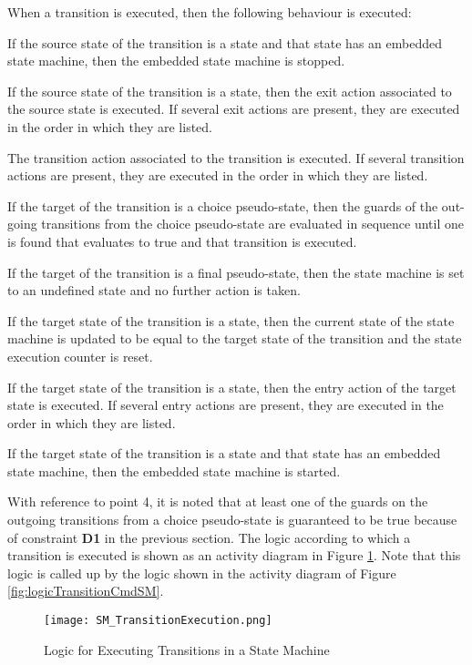 When a transition is executed, then the following behaviour is executed:

\begin{fw_enumerate}
\item If the source state of the transition is a state and that state has an embedded state
machine, then the embedded state machine is stopped.
\item If the source state of the transition is a state, then the exit action associated to the
source state is executed. If several exit actions are present, they are executed in the
order in which they are listed.
\item The transition action associated to the transition is executed. If several transition
actions are present, they are executed in the order in which they are listed.
\item If the target of the transition is a choice pseudo-state, then the guards of the out-going
transitions from the choice pseudo-state are evaluated in sequence until one is found
that evaluates to true and that transition is executed.
\item If the target of the transition is a final pseudo-state, then the state machine is set to an
undefined state and no further action is taken.
\item If the target state of the transition is a state, then the current state of the state machine
is updated to be equal to the target state of the transition and the state execution counter is
reset.
\item If the target state of the transition is a state, then the entry action of the target state is
executed. If several entry actions are present, they are executed in the order in which
they are listed.
\item If the target state of the transition is a state and that state has an embedded state
machine, then the embedded state machine is started.
\end{fw_enumerate}

With reference to point 4, it is noted that at least one of the guards on the outgoing transitions from a choice pseudo-state is guaranteed to be true 
because of constraint \textbf{D1} in the previous section.
The logic according to which a transition is executed is shown as an activity diagram in Figure \ref{fig:execTransitionSM}. Note that this logic is called up 
by the logic shown in the activity diagram of Figure \ref{fig:logicTransitionCmdSM}.

\begin{figure}[ht]
 \centering
 \texttt{[image: SM\_TransitionExecution.png]}
 \caption{Logic for Executing Transitions in a State Machine}
 \label{fig:execTransitionSM}
\end{figure}

